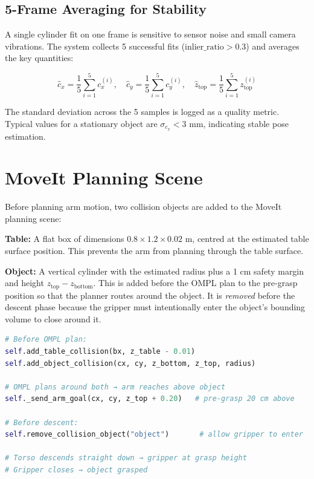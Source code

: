 \subsection{5-Frame Averaging for Stability}

A single cylinder fit on one frame is sensitive to sensor noise and small camera
vibrations.
The system collects 5 successful fits ($\text{inlier\_ratio} > 0.3$) and averages the
key quantities:

\begin{equation}
  \hat{c}_x = \frac{1}{5}\sum_{i=1}^{5} c_x^{(i)}, \quad
  \hat{c}_y = \frac{1}{5}\sum_{i=1}^{5} c_y^{(i)}, \quad
  \hat{z}_{\text{top}} = \frac{1}{5}\sum_{i=1}^{5} z_{\text{top}}^{(i)}
\end{equation}

The standard deviation across the 5 samples is logged as a quality metric.
Typical values for a stationary object are $\sigma_{c_x} < 3$ mm, indicating
stable pose estimation.

\section{MoveIt Planning Scene}

Before planning arm motion, two collision objects are added to the MoveIt planning scene:

\textbf{Table:} A flat box of dimensions $0.8 \times 1.2 \times 0.02$ m, centred at
the estimated table surface position.
This prevents the arm from planning through the table surface.

\textbf{Object:} A vertical cylinder with the estimated radius plus a 1 cm safety
margin and height $z_{\text{top}} - z_{\text{bottom}}$.
This is added before the OMPL plan to the pre-grasp position so that the planner
routes around the object.
It is \emph{removed} before the descent phase because the gripper must intentionally
enter the object's bounding volume to close around it.

\begin{lstlisting}[language=Python, caption={Collision object lifecycle during grasp.}]
# Before OMPL plan:
self.add_table_collision(bx, z_table - 0.01)
self.add_object_collision(cx, cy, z_bottom, z_top, radius)

# OMPL plans around both → arm reaches above object
self._send_arm_goal(cx, cy, z_top + 0.20)   # pre-grasp 20 cm above

# Before descent:
self.remove_collision_object("object")       # allow gripper to enter

# Torso descends straight down → gripper at grasp height
# Gripper closes → object grasped
\end{lstlisting}

